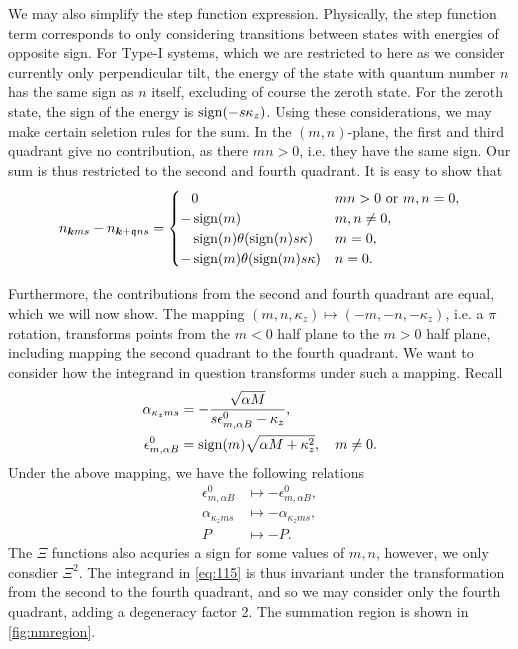 We may also simplify the step function expression.
Physically, the step function term corresponds to only considering transitions between states with energies of opposite sign.
For Type-I systems, which we are restricted to here as we consider currently only perpendicular tilt, the energy of the state with quantum number \( n \) has the same sign as \( n \) itself, excluding of course the zeroth state.
For the zeroth state, the sign of the energy is \( \operatorname{sign}(-s \kappa_z) \).
Using these considerations, we may make certain seletion rules for the sum.
In the \( (m,n) \)-plane, the first and third quadrant give no contribution, as there \( m n > 0 \), i.e. they have the same sign.
Our sum is thus restricted to the second and fourth quadrant.
It is easy to show that
\begin{equation}
  \label{eq:116}
  n_{\bm{k} m s} - n_{\bm{k} + \mathfrak{q} n s} =
  \begin{cases}
    \phantom{-} 0 & m n > 0 \text{ or  } m,n = 0,\\
    - \operatorname{sign}(m) & m,n \neq 0,\\
    \phantom{-} \operatorname{sign}(n) \theta(\operatorname{sign}(n) s \kappa) & m = 0,\\
    -\operatorname{sign}(m) \theta(\operatorname{sign}(m) s \kappa) & n = 0.
  \end{cases}
\end{equation}

Furthermore, the contributions from the second and fourth quadrant are equal, which we will now show.
The mapping \( (m,n, \kappa_z) \mapsto (-m, -n, -\kappa_z) \), i.e. a \( \pi \) rotation, transforms points from the \( m < 0 \) half plane to the \( m > 0 \) half plane, including mapping the second quadrant to the fourth quadrant.
We want to consider how the integrand in question transforms under such a mapping.
Recall
\begin{align*}
  \alpha_{\kappa_z m s} &= - \frac{\sqrt{\alpha M} }{s \epsilon_{m, \alpha B}^0 - \kappa_z},\\
  \epsilon_{m, \alpha B}^0 &= \operatorname{sign}(m) \sqrt{\alpha M + \kappa_z^2}, \quad m \neq 0.
\end{align*}
Under the above mapping, we have the following relations
\begin{align}
  \label{eq:117}
  \epsilon_{m, \alpha B}^0 &\mapsto -\epsilon_{m, \alpha B}^0,\\
  \alpha_{\kappa_z m s} &\mapsto -\alpha_{\kappa_z m s},\\
  P &\mapsto -P.
\end{align}
The \( \Xi \) functions also acquries a sign for some values of \( m,n \), however, we only consdier \( \Xi^2 \).
The integrand in \cref{eq:115} is thus invariant under the transformation from the second to the fourth quadrant, and so we may consider only the fourth quadrant, adding a degeneracy factor 2.
The summation region is shown in \cref{fig:nmregion}.


